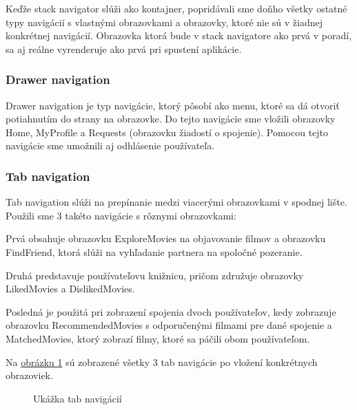 Keďže stack navigator slúži ako kontajner, popridávali sme doňho všetky ostatné typy navigácií s vlastnými obrazovkami a obrazovky, ktoré nie sú v žiadnej konkrétnej navigácií. Obrazovka ktorá bude v stack navigatore ako prvá v poradí, sa aj reálne vyrenderuje ako prvá pri spustení aplikácie. 

\subsubsection{Drawer navigation}
Drawer navigation je typ navigácie, ktorý pôsobí ako menu, ktoré sa dá otvoriť potiahnutím do strany na obrazovke. Do tejto navigácie sme vložili obrazovky Home, MyProfile a Requests (obrazovku žiadostí o spojenie). Pomocou tejto navigácie sme umožnili aj odhlásenie používateľa.
\subsubsection{Tab navigation}
Tab navigation slúži na prepínanie medzi viacerými obrazovkami v spodnej lište. Použili sme 3 takéto navigácie s rôznymi obrazovkami: 
\begin{itemize}
{\item Prvá obsahuje obrazovku ExploreMovies na objavovanie filmov a obrazovku FindFriend, ktorá slúži na vyhľadanie partnera na spoločné pozeranie. } 
{\item Druhá predstavuje používateľovu knižnicu, pričom združuje obrazovky LikedMovies a DislikedMovies.} 
{\item Posledná je použitá pri zobrazení spojenia dvoch používateľov, kedy zobrazuje obrazovku RecommendedMovies s odporučenými filmami pre dané spojenie a MatchedMovies, ktorý zobrazí filmy, ktoré sa páčili obom používateľom.} 
\end{itemize}

Na \hyperref[tabnav]{obrázku \ref{tabnav}} sú zobrazené všetky 3 tab navigácie po vložení konkrétnych obrazoviek.

\begin{figure}[hbt!]
  \centering   
  \def\stackalignment{c}
           \scriptsize
	\caption{Ukážka tab navigácií}  
  \label{tabnav}
\end{figure}

